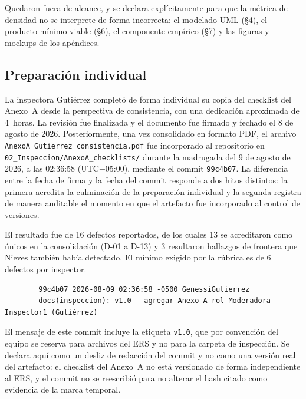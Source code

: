 \documentclass[journal,onecolumn]{IEEEtran}
\begin{document}
	Quedaron fuera de alcance, y se declara explícitamente para que la métrica de
	densidad no se interprete de forma incorrecta: el modelado UML (\S4), el
	producto mínimo viable (\S6), el componente empírico (\S7) y las figuras y
	mockups de los apéndices.
	
	\subsection{Preparación individual}
	
	La inspectora Gutiérrez completó de forma individual su copia del checklist
	del Anexo~A desde la perspectiva de consistencia, con una dedicación
	aproximada de 4~horas. La revisión fue finalizada y el documento fue firmado
	y fechado el 8 de agosto de 2026. Posteriormente, una vez consolidado en
	formato PDF, el archivo
	\texttt{AnexoA\_\allowbreak Gutierrez\_\allowbreak consistencia.pdf} fue
	incorporado al repositorio en
	\texttt{02\_\allowbreak Inspeccion/\allowbreak AnexoA\_\allowbreak checklists/}
	durante la madrugada del 9 de agosto de 2026, a las 02:36:58
	(UTC$-$05:00), mediante el commit \texttt{99c4b07}. La diferencia entre la
	fecha de firma y la fecha del commit responde a dos hitos distintos: la
	primera acredita la culminación de la preparación individual y la segunda
	registra de manera auditable el momento en que el artefacto fue incorporado
	al control de versiones.
	
	El resultado fue de 16 defectos reportados, de los cuales 13 se acreditaron
	como únicos en la consolidación (D-01 a D-13) y 3 resultaron hallazgos de
	frontera que Nieves también había detectado. El mínimo exigido por la
	rúbrica es de 6 defectos por inspector.
	
	\begin{verbatim}
		99c4b07 2026-08-09 02:36:58 -0500 GenessiGutierrez
		docs(inspeccion): v1.0 - agregar Anexo A rol Moderadora-Inspector1 (Gutiérrez)
	\end{verbatim}
	
	El mensaje de este commit incluye la etiqueta \texttt{v1.0}, que por
	convención del equipo se reserva para archivos del ERS y no para la carpeta
	de inspección. Se declara aquí como un desliz de redacción del commit y no
	como una versión real del artefacto: el checklist del Anexo~A no está
	versionado de forma independiente al ERS, y el commit no se reescribió para
	no alterar el hash citado como evidencia de la marca temporal.
	
\end{document}
